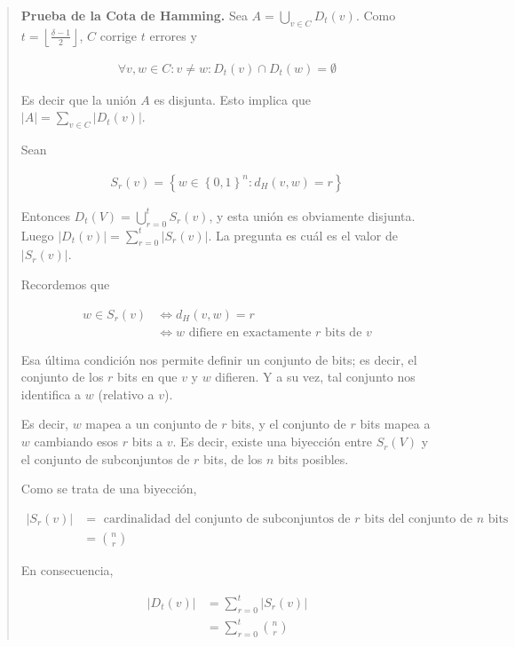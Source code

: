 \documentclass[a4paper]{article}
\begin{document}
\small
\begin{quote}

    \textbf{Prueba de la Cota de Hamming.} Sea $A = \bigcup_{v \in C} D_t(v)$. Como $t = \left\lfloor \frac{\delta-1}{2} \right\rfloor$, $C$ corrige $t$ errores y 

    \begin{align*}
        \forall v, w \in C: v \neq w : D_t(v) \cap D_t(w) = \emptyset
    \end{align*}

    Es decir que la unión $A$ es disjunta. Esto implica que $|A| = \sum_{v \in C} |D_t(v)|$.

    Sean

    \begin{align*}
        S_r(v) = \left\{ w \in \left\{ 0, 1 \right\}^n : d_H(v, w) = r \right\} 
    \end{align*}

    Entonces $D_t(V) = \bigcup_{r=0}^{t} S_r(v)$, y esta unión es obviamente disjunta. Luego 
    $|D_t(v)| = \sum_{r = 0}^{t} |S_r(v)|$. La pregunta es cuál es el valor de $|S_r(v)|$.

    Recordemos que 

    \begin{align*}
        w \in S_r(v) &\iff d_H(v, w) = r \\ 
                     &\iff w \text{ difiere en exactamente $r$ bits de } v
    \end{align*}

    Esa última condición nos permite definir un conjunto de bits; es decir, 
    el conjunto de los $r$ bits en que $v$ y $w$ difieren. Y a su vez, tal 
    conjunto nos identifica a $w$ (relativo a $v$). 

    Es decir, $w$ mapea a un conjunto de $r$ bits, y el conjunto de $r$ bits 
    mapea a $w$ cambiando esos $r$ bits a $v$. Es decir, existe una biyección 
    entre $S_r(V)$ y el conjunto de subconjuntos de $r$ bits, de los $n$
    bits posibles.

    Como se trata de una biyección, 

    \begin{align*}
        |S_r(v)| &= \text{ cardinalidad del conjunto de subconjuntos de $r$ bits del conjunto de $n$ bits} \\ 
                 &= \binom{n}{r}
    \end{align*}


    En consecuencia, 

    \begin{align*}
        |D_t(v)| &= \sum_{r=0}^{t} |S_r(v)| \\ 
                 &= \sum_{r=0}^{t} \binom{n}{r}
    \end{align*}


\end{quote}
\end{document}
